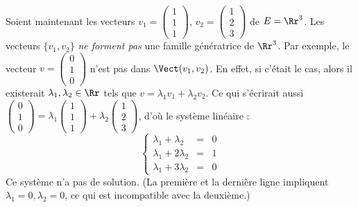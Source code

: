 \documentclass[class=report,crop=false]{standalone}
\begin{document}
\begin{exemple}
Soient maintenant les vecteurs
$v_1=\left(\begin{smallmatrix}1\\1\\1\end{smallmatrix}\right)$,
$v_2=\left(\begin{smallmatrix}1\\2\\3\end{smallmatrix}\right)$ de $E=\Rr^3$.
Les vecteurs $\{ v_1,v_2\}$ \emph{ne forment pas} une famille génératrice de $\Rr^3$.
Par exemple, le vecteur $v=\left(\begin{smallmatrix}0\\1\\0\end{smallmatrix}\right)$ n'est pas dans $\Vect (v_1,v_2)$.
En effet, si c'était le cas, alors il existerait $\lambda_1,\lambda_2 \in \Rr$ tels que
$v=\lambda_1 v_1 + \lambda_2 v_2$.
Ce qui s'écrirait aussi $\left(\begin{smallmatrix}0\\1\\0\end{smallmatrix}\right)=
\lambda_1 \left(\begin{smallmatrix}1\\1\\1\end{smallmatrix}\right) +
\lambda_2 \left(\begin{smallmatrix}1\\2\\3\end{smallmatrix}\right)$,
d'où le système linéaire :
$$
\left\{\begin{array}{rcl}
\lambda_1 + \lambda_2 & = & 0\\
\lambda_1 + 2\lambda_2 & = & 1\\
\lambda_1 + 3\lambda_2 & = & 0
\end{array}\right.
$$
Ce système n'a pas de solution. (La première et la dernière ligne
impliquent $\lambda_1=0,\lambda_2=0$, ce qui est incompatible avec la deuxième.)
\end{exemple}
\end{document}
